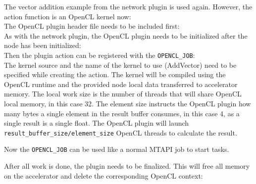 The vector addition example from the network plugin is used again. However, the action function is an OpenCL kernel now:
%
\\
%
The OpenCL plugin header file needs to be included first:
%
\\
%
As with the network plugin, the OpenCL plugin needs to be initialized after the node has been initialized:
%
\\
%
Then the plugin action can be registered with the \lstinline|OPENCL_JOB|:
%
\\
%
The kernel source and the name of the kernel to use (AddVector) need to be specified while creating the action. The kernel will be compiled using the OpenCL runtime and the provided node local data transferred to accelerator memory. The local work size is the number of threads that will share OpenCL local memory, in this case 32. The element size instructs the OpenCL plugin how many bytes a single element in the result buffer consumes, in this case 4, as a single result is a single float. The OpenCL plugin will launch \lstinline|result_buffer_size/element_size| OpenCL threads to calculate the result.

Now the \lstinline|OPENCL_JOB| can be used like a normal MTAPI job to start tasks.

After all work is done, the plugin needs to be finalized. This will free all memory on the accelerator and delete the corresponding OpenCL context:
%
\\
%
